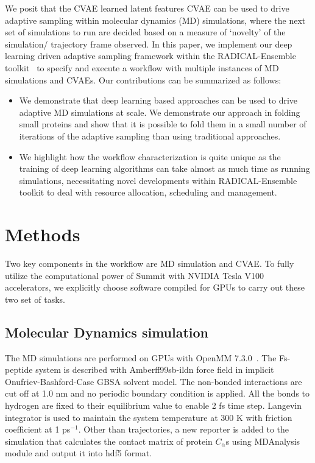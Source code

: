 \documentclass[conference,final]{IEEEtran}
\begin{document}
We posit that the CVAE learned latent features CVAE can be used to drive adaptive sampling within molecular dynamics (MD) simulations, where the next set of simulations to run are decided based on a measure of ‘novelty’ of the simulation/ trajectory frame observed. In this paper, we implement our deep learning driven adaptive sampling framework within the RADICAL-Ensemble toolkit~\cite{balasubramanian2018harnessing} to specify and execute a workflow with multiple instances of MD simulations and CVAEs. Our contributions can be summarized as follows: 
\begin{itemize}
\item We demonstrate that deep learning based approaches can be used to drive adaptive MD simulations at scale. We demonstrate our approach in folding small proteins and show that it is possible to fold them in a small number of iterations of the adaptive sampling than using traditional approaches. 
\item We highlight how the workflow characterization is quite unique as the training of deep learning algorithms can take almost as much time as running simulations, necessitating novel developments within RADICAL-Ensemble toolkit to deal with resource allocation, scheduling and management. 
\end{itemize}


\section{Methods} 

Two key components in the workflow are MD simulation and CVAE. To fully
utilize the computational power of Summit with NVIDIA Tesla V100
accelerators, we explicitly choose software compiled for GPUs to carry out
these two set of tasks.


\subsection{Molecular Dynamics simulation}

The MD simulations are performed on GPUs with OpenMM
7.3.0~\cite{eastman2017openmm}. The Fs-peptide system is described with 
Amberff99sb-ildn force field in implicit Onufriev-Bashford-Case GBSA solvent 
model. The non-bonded 
interactions are cut off at 1.0 nm and no periodic boundary condition is
applied. All the bonds to hydrogen are fixed to their equilibrium value to
enable 2 fs time step. Langevin integrator is used to maintain the system
temperature at 300 K with friction coefficient at 1 ps$^{-1}$. Other than
trajectories, a new reporter is added to the simulation that calculates the 
contact matrix of protein $C_{\alpha}$s using 
MDAnalysis~\cite{michaud2011mdanalysis,gowers2016mdanalysis} 
module and output it into hdf5 format. 
\end{document}
